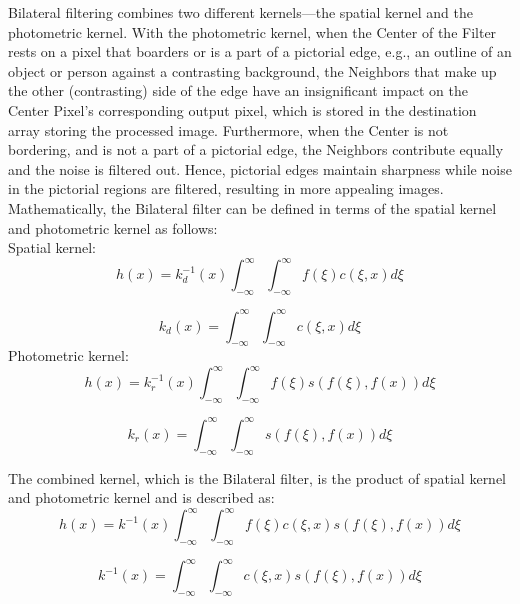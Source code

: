 \documentclass{IEEEtran}
\begin{document}
Bilateral filtering combines two different kernels---the spatial kernel and the photometric kernel. With the photometric kernel, when the Center of the Filter rests on a pixel that boarders or is a part of a pictorial edge, e.g., an outline of an object or person against a contrasting background, the Neighbors that make up the other (contrasting) side of the edge have an insignificant impact on the Center Pixel's corresponding output pixel, which is stored in the destination array storing the processed image. Furthermore, when the Center is not bordering, and is not a part of a pictorial edge, the Neighbors contribute equally and the noise is filtered out. Hence, pictorial edges maintain sharpness while noise in the pictorial regions are filtered, resulting in more appealing images. Mathematically, the Bilateral filter can be defined in terms of the spatial kernel and photometric kernel as follows\cite{Tomasi1998}:\\


Spatial kernel: 
\begin{equation}
h(x)=k_{d}^{-1}(x)\int_{-\infty}^{\infty}\int_{-\infty}^{\infty}f(\xi)c(\xi,x)d\xi\label{spatial}
\end{equation}
 
\begin{equation}
k_{d}(x)=\int_{-\infty}^{\infty}\int_{-\infty}^{\infty}c(\xi,x)d\xi
\end{equation}
 Photometric kernel: 
\begin{equation}
h(x)=k_{r}^{-1}(x)\int_{-\infty}^{\infty}\int_{-\infty}^{\infty}f(\xi)s(f(\xi),f(x))d\xi\label{photometric}
\end{equation}
 
\begin{equation}
k_{r}(x)=\int_{-\infty}^{\infty}\int_{-\infty}^{\infty}s(f(\xi),f(x))d\xi
\end{equation}


The combined kernel, which is the Bilateral filter, is the product
of spatial kernel and photometric kernel and is described as: 
\begin{equation}
h(x)=k^{-1}(x)\int_{-\infty}^{\infty}\int_{-\infty}^{\infty}f(\xi)c(\xi,x)s(f(\xi),f(x))d\xi\label{combined}
\end{equation}
 
\begin{equation}
k^{-1}(x)=\int_{-\infty}^{\infty}\int_{-\infty}^{\infty}c(\xi,x)s(f(\xi),f(x))d\xi
\end{equation}
\end{document}

